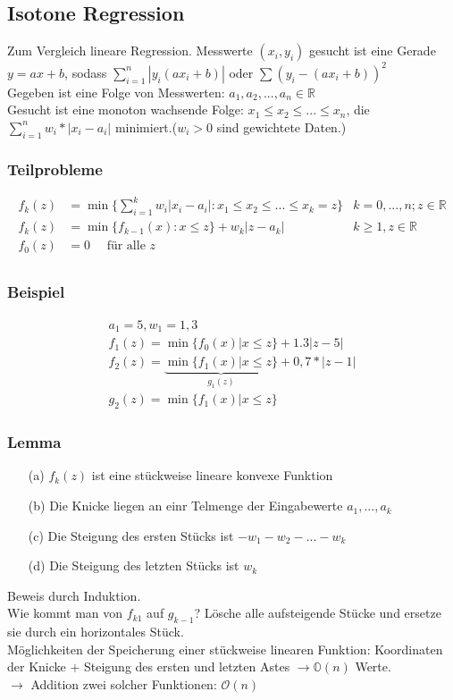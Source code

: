 \subsection{Isotone Regression}
Zum Vergleich lineare Regression. Messwerte $(x_i, y_i)$ gesucht ist eine Gerade $y = ax + b$, sodass $\sum_{i=1}^n |y_i (a x_i + b)|$ oder $\sum (y_i - (a x_i + b))^2$\\
Gegeben ist eine Folge von Messwerten: $a_1,a_2,..., a_n \in \mathbb{R}$\\
Gesucht ist eine monoton wachsende Folge: $x_1 \leq x_2 \leq ... \leq x_n$, die $\sum_{i=1}^n w_i * |x_i - a_i|$ minimiert.($w_i > 0$ sind gewichtete Daten.)\\
\subsubsection{Teilprobleme}
\begin{align*}
f_k(z) &= \min \{ \sum_{i=1}^k w_i |x_i -a_i| : x_1 \leq x_2 \leq ... \leq x_k = z \} & k=0,...,n; z \in \mathbb{R}\\
f_k(z) &= \min \{ f_{k-1} (x) : x \leq z \} + w_k |z-a_k| & k \geq 1, z \in \mathbb{R}\\
f_0(z) &= 0 \quad \text{ für alle } z&\\
\end{align*}
\subsubsection*{Beispiel}
\begin{align*}
a_1 = 5, w_1 = 1,3\\
f_1(z) = \min \{ f_0(x) | x \leq z\} + 1.3 |z-5|\\
f_2(z) = \underbrace{ \min \{ f_1(x) | x \leq z \}}_{g_1(z)} + 0,7 * |z-1|\\
g_2(z) = \min \{f_1(x) | x \leq z \} 
\end{align*}
\subsubsection*{Lemma}
\begin{enumerate}
\item[(a)] $f_k(z)$ ist eine stückweise lineare konvexe Funktion
\item[(b)] Die Knicke liegen an einr Telmenge der Eingabewerte $a_1,...,a_k$
\item[(c)] Die Steigung des ersten Stücks ist $-w_1-w_2-...-w_k$ 
\item[(d)] Die Steigung des letzten Stücks ist $w_k$
\end{enumerate}
Beweis durch Induktion.\\
Wie kommt man von $f_{k1}$ auf $g_{k-1}$? Lösche alle aufsteigende Stücke und ersetze sie durch ein horizontales Stück.\\
Möglichkeiten der Speicherung einer stückweise linearen Funktion: Koordinaten der Knicke $+$ Steigung des ersten und letzten Astes $\rightarrow \mathbb{O}(n)$ Werte.\\
$\rightarrow $ Addition zwei solcher Funktionen: $\mathcal{O}(n)$\\
